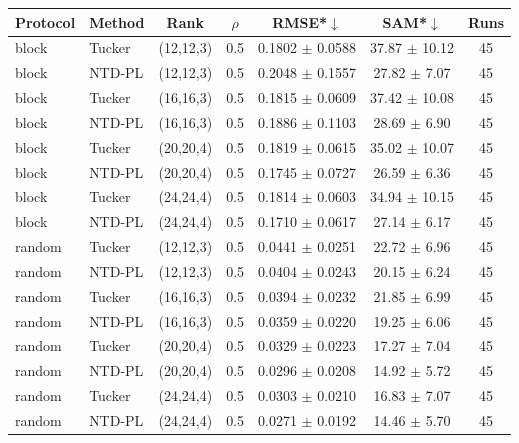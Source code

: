 \begin{tabular}{@{}l l c c c c c@{}}
\toprule
Protocol & Method & Rank & $\rho$ & RMSE*$\downarrow$ & SAM*$\downarrow$ & Runs\\
\midrule
block & Tucker & (12,12,3) & 0.5 & 0.1802 $\pm$ 0.0588 & 37.87 $\pm$ 10.12 & 45\\
block & NTD-PL & (12,12,3) & 0.5 & 0.2048 $\pm$ 0.1557 & 27.82 $\pm$ 7.07 & 45\\
block & Tucker & (16,16,3) & 0.5 & 0.1815 $\pm$ 0.0609 & 37.42 $\pm$ 10.08 & 45\\
block & NTD-PL & (16,16,3) & 0.5 & 0.1886 $\pm$ 0.1103 & 28.69 $\pm$ 6.90 & 45\\
block & Tucker & (20,20,4) & 0.5 & 0.1819 $\pm$ 0.0615 & 35.02 $\pm$ 10.07 & 45\\
block & NTD-PL & (20,20,4) & 0.5 & 0.1745 $\pm$ 0.0727 & 26.59 $\pm$ 6.36 & 45\\
block & Tucker & (24,24,4) & 0.5 & 0.1814 $\pm$ 0.0603 & 34.94 $\pm$ 10.15 & 45\\
block & NTD-PL & (24,24,4) & 0.5 & 0.1710 $\pm$ 0.0617 & 27.14 $\pm$ 6.17 & 45\\
random & Tucker & (12,12,3) & 0.5 & 0.0441 $\pm$ 0.0251 & 22.72 $\pm$ 6.96 & 45\\
random & NTD-PL & (12,12,3) & 0.5 & 0.0404 $\pm$ 0.0243 & 20.15 $\pm$ 6.24 & 45\\
random & Tucker & (16,16,3) & 0.5 & 0.0394 $\pm$ 0.0232 & 21.85 $\pm$ 6.99 & 45\\
random & NTD-PL & (16,16,3) & 0.5 & 0.0359 $\pm$ 0.0220 & 19.25 $\pm$ 6.06 & 45\\
random & Tucker & (20,20,4) & 0.5 & 0.0329 $\pm$ 0.0223 & 17.27 $\pm$ 7.04 & 45\\
random & NTD-PL & (20,20,4) & 0.5 & 0.0296 $\pm$ 0.0208 & 14.92 $\pm$ 5.72 & 45\\
random & Tucker & (24,24,4) & 0.5 & 0.0303 $\pm$ 0.0210 & 16.83 $\pm$ 7.07 & 45\\
random & NTD-PL & (24,24,4) & 0.5 & 0.0271 $\pm$ 0.0192 & 14.46 $\pm$ 5.70 & 45\\
\bottomrule
\end{tabular}
